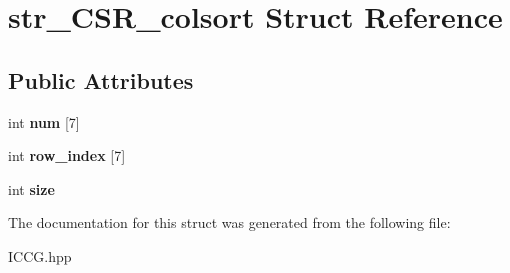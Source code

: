 \hypertarget{structstr__CSR__colsort}{}\section{str\+\_\+\+C\+S\+R\+\_\+colsort Struct Reference}
\label{structstr__CSR__colsort}
\subsection*{Public Attributes}
\begin{DoxyCompactItemize}
\item 
int {\bfseries num} \mbox{[}7\mbox{]}\hypertarget{structstr__CSR__colsort_a723f746f9339a65a199e68d710cd1f09}{}\label{structstr__CSR__colsort_a723f746f9339a65a199e68d710cd1f09}

\item 
int {\bfseries row\+\_\+index} \mbox{[}7\mbox{]}\hypertarget{structstr__CSR__colsort_a5ed048077e5875959028416e0ab75362}{}\label{structstr__CSR__colsort_a5ed048077e5875959028416e0ab75362}

\item 
int {\bfseries size}\hypertarget{structstr__CSR__colsort_a1cfb22e094e939f5a3770b3a08f3b31a}{}\label{structstr__CSR__colsort_a1cfb22e094e939f5a3770b3a08f3b31a}

\end{DoxyCompactItemize}


The documentation for this struct was generated from the following file\+:\begin{DoxyCompactItemize}
\item 
I\+C\+C\+G.\+hpp\end{DoxyCompactItemize}
